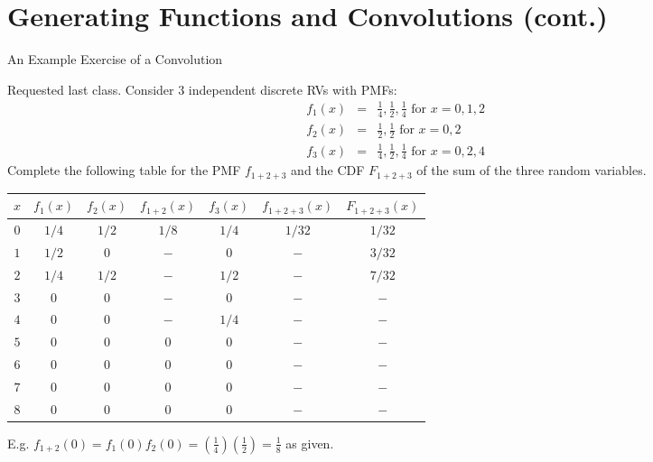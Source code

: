 \documentclass[11pt]{beamer}
\begin{document}
\section{Generating Functions and Convolutions (cont.)}
\begin{frame}{An Example Exercise of a Convolution } 

Requested last class. Consider 3 independent discrete RVs with PMFs:
  \begin{eqnarray*}
    f_{1}\left( x\right)  &=&\frac{1}{4},\frac{1}{2},\frac{1}{4}\text{ for }x=0,1,2 \\
    f_{2}\left( x\right)  &=&\frac{1}{2},\frac{1}{2}\text{ for }x=0,2 \\
    f_{3}\left( x\right)  &=&\frac{1}{4},\frac{1}{2},\frac{1}{4}\text{ for }x=0,2,4
  \end{eqnarray*}
  Complete the following table for the PMF $f_{1+2+3}$ and the CDF $F_{1+2+3}$ of the sum of the three random variables.
  
\end{frame}
\begin{frame}
  \begin{center}
    \vspace{-0.3cm}
    \begin{tabular}{ccccccc}
      \hline $x$ & $f_{1}\left( x\right) $ & $f_{2}\left( x\right) $ &
      $f_{1+2}\left(
        x\right) $ & $f_{3}\left( x\right) $ & $f_{1+2+3}\left( x\right) $ & $%
      F_{1+2+3}\left( x\right) $ \\ \hline
      $0$ & $1/4$ & $1/2$ & $1/8$ & $1/4$ & $1/32$ & $1/32$ \\
      $1$ & $1/2$ & $0$ & $-$ & $0$ & $-$ & $3/32$ \\
      $2$ & $1/4$ & $1/2$ & $-$ & $1/2$ & $-$ & $7/32$ \\
      $3$ & $0$ & $0$ & $-$ & $0$ & $-$ & $-$ \\
      $4$ & $0$ & $0$ & $-$ & $1/4$ & $-$ & $-$ \\
      $5$ & $0$ & $0$ & $0$ & $0$ & $-$ & $-$ \\
      $6$ & $0$ & $0$ & $0$ & $0$ & $-$ & $-$ \\
      $7$ & $0$ & $0$ & $0$ & $0$ & $-$ & $-$ \\
      $8$ & $0$ & $0$ & $0$ & $0$ & $-$ & $-$ \\ \hline
    \end{tabular}
  \end{center}

E.g. $f_{1+2}(0) = f_1(0)f_2(0) = \left(\frac{1}{4}\right) \left(\frac{1}{2}\right)=\frac{1}{8}$ as given. 
  
\end{frame}
\end{document}
